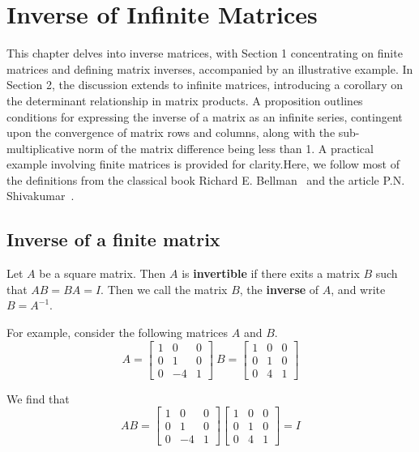 \chapter{Inverse of Infinite Matrices}
This chapter delves into inverse matrices, with Section 1 concentrating on finite matrices and defining matrix inverses, accompanied by an illustrative example. In Section 2, the discussion extends to infinite matrices, introducing a corollary on the determinant relationship in matrix products. A proposition outlines conditions for expressing the inverse of a matrix as an infinite series, contingent upon the convergence of matrix rows and columns, along with the sub-multiplicative norm of the matrix difference being less than 1. A practical example involving finite matrices is provided for clarity.Here, we follow most of the definitions from the classical book  Richard E. Bellman~\cite{bellman1997introduction} and the article P.N. Shivakumar~\cite{infinite_PN_SHIVA_2009}.



\section{Inverse of a finite matrix}
Let $A$ be a square matrix. Then $A$ is \textbf{invertible} if there exits a matrix $B$ such that $AB = BA = I$. Then we call the matrix $B$, the \textbf{inverse} of $A$, and write $B = A^{-1}$.

For example, consider the following matrices $A$ and $B$. 
\[
    A = 
    \begin{bmatrix}
    1 & 0 & 0\\
    0 & 1 & 0\\
    0 & -4 & 1
\end{bmatrix}
~B =
\begin{bmatrix}
    1 & 0 & 0\\
    0 & 1 & 0\\
    0 & 4 & 1
\end{bmatrix}
\]

We find that
\[ 
    AB = 
    \begin{bmatrix}
    1 & 0 & 0\\
    0 & 1 & 0\\
    0 & -4 & 1
\end{bmatrix}
\begin{bmatrix}
    1 & 0 & 0\\
    0 & 1 & 0\\
    0 & 4 & 1
\end{bmatrix}
= I
\]

